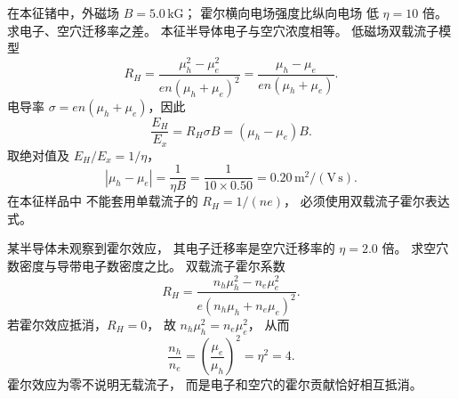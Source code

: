 在本征锗中，外磁场
$B=5.0\,\mathrm{kG}$；
霍尔横向电场强度比纵向电场
低 $\eta=10$ 倍。求电子、空穴迁移率之差。
\exsolution
本征半导体电子与空穴浓度相等。
低磁场双载流子模型
\[
 R_H=\frac{\mu_h^2-\mu_e^2}
 {en(\mu_h+\mu_e)^2}
 =\frac{\mu_h-\mu_e}{en(\mu_h+\mu_e)}.
\]
电导率
$\sigma=en(\mu_h+\mu_e)$，因此
\[
 \frac{E_H}{E_x}=R_H\sigma B
 =(\mu_h-\mu_e)B.
\]
取绝对值及 $E_H/E_x=1/\eta$，
\[
 \boxed{|\mu_h-\mu_e|=\frac1{\eta B}
 =\frac1{10\times0.50}
 =0.20\,\mathrm{m^2/(V\,s)}}.
\]
\excheck 在本征样品中
不能套用单载流子的 $R_H=1/(ne)$，
必须使用双载流子霍尔表达式。

某半导体未观察到霍尔效应，
其电子迁移率是空穴迁移率的
$\eta=2.0$ 倍。
求空穴数密度与导带电子数密度之比。
\exsolution
双载流子霍尔系数
\[
 R_H=\frac{n_h\mu_h^2-n_e\mu_e^2}
 {e(n_h\mu_h+n_e\mu_e)^2}.
\]
若霍尔效应抵消，$R_H=0$，
故
$n_h\mu_h^2=n_e\mu_e^2$，
从而
\[
 \boxed{\frac{n_h}{n_e}=
 \left(\frac{\mu_e}{\mu_h}\right)^2
 =\eta^2=4}.
\]
\excheck 霍尔效应为零不说明无载流子，
而是电子和空穴的霍尔贡献恰好相互抵消。
